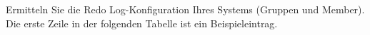       \item Ermitteln Sie die Redo Log-Konfiguration Ihres Systems (Gruppen und Member). Die erste Zeile in der folgenden Tabelle ist ein Beispieleintrag.
